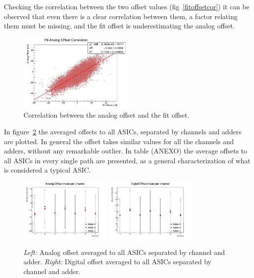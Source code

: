 \documentclass[a4paper,10pt]{book}
\begin{document}
Checking the correlation between the two offset values (fig~\ref{fitoffsetcor}) it can be observed that even there is a clear correlation between them, a factor relating them must be missing, and the fit offset is underestimating the analog offset. 
\\
\begin{figure}
\centering
 \includegraphics[width=0.5\textwidth]{./fitanalogcor.jpg}
  \caption{Correlation between the analog offset and the fit offset.}
    \label{fig:fitoffsetcor}
\end{figure}

In figure~\ref{fig:offch} the averaged offsets to all ASICs, separated by channels and adders are plotted. In general the offset takes similar values for all the channels and adders, without any remarkable outlier.
In table (ANEXO) the average offsets to all ASICs in every single path are presented, as a general characterization of what is considered a typical ASIC. 
\\

\begin{figure}
\centering
 \includegraphics[width=0.4\textwidth]{./analogch.png}
  \includegraphics[width=0.4\textwidth]{./digitalch.png}
  \caption{\textit{Left:} Analog offset averaged to all ASICs separated by channel and adder. \textit{Right:} Digital offset averaged to all ASICs separated by channel and adder.}
    \label{fig:offch}
\end{figure}
\end{document}
